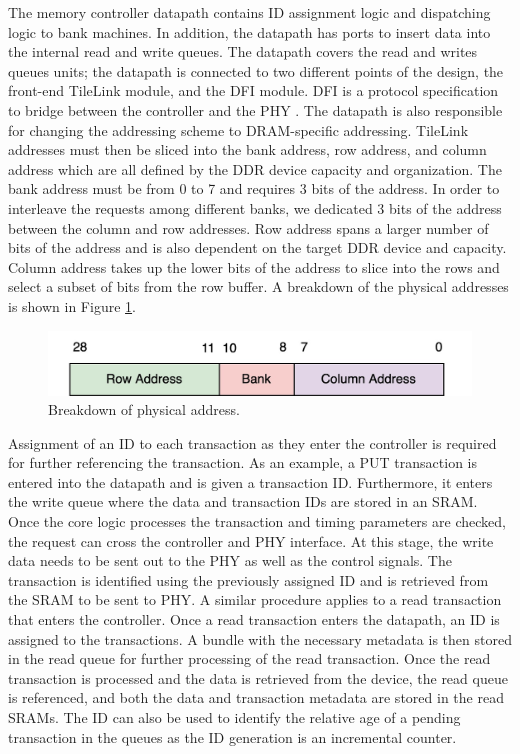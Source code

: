 The memory controller datapath contains ID assignment logic and dispatching logic to bank machines. In addition, the datapath has ports to insert data into the internal read and write queues. The datapath covers the read and writes queues units; the datapath is connected to two different points of the design, the front-end TileLink module, and the DFI module. DFI is a protocol specification to bridge between the controller and the PHY \cite{dfi}. The datapath is also responsible for changing the addressing scheme to DRAM-specific addressing. TileLink addresses must then be sliced into the bank address, row address, and column address which are all defined by the DDR device capacity and organization. The bank address must be from 0 to 7 and requires 3 bits of the address. In order to interleave the requests among different banks, we dedicated 3 bits of the address between the column and row addresses. Row address spans a larger number of bits of the address and is also dependent on the target DDR device and capacity. Column address takes up the lower bits of the address to slice into the rows and select a subset of bits from the row buffer. A breakdown of the physical addresses is shown in Figure \ref{fig:addr}.
\begin{figure}
    \centering
    \includegraphics[scale=0.3]{images/address.jpg}
    \caption{Breakdown of physical address.}
    \label{fig:addr}
\end{figure}

Assignment of an ID to each transaction as they enter the controller is required for further referencing the transaction. As an example, a PUT transaction is entered into the datapath and is given a transaction ID. Furthermore, it enters the write queue where the data and transaction IDs are stored in an SRAM. Once the core logic processes the transaction and timing parameters are checked, the request can cross the controller and PHY interface. At this stage, the write data needs to be sent out to the PHY as well as the control signals. The transaction is identified using the previously assigned ID and is retrieved from the SRAM to be sent to PHY. A similar procedure applies to a read transaction that enters the controller. Once a read transaction enters the datapath, an ID is assigned to the transactions. A bundle with the necessary metadata is then stored in the read queue for further processing of the read transaction. Once the read transaction is processed and the data is retrieved from the device, the read queue is referenced, and both the data and transaction metadata are stored in the read SRAMs. The ID can also be used to identify the relative age of a pending transaction in the queues as the ID generation is an incremental counter. 

